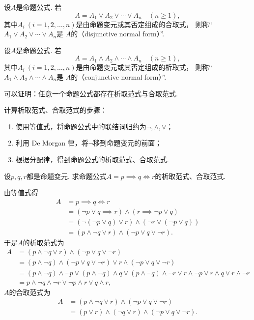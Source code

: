 \begin{definition}
设\(A\)是命题公式.
若\[
	A = A_1 \lor A_2 \lor \dotsb \lor A_n
	\quad(n\geq1),
\]
其中\(A_i\ (i=1,2,\dotsc,n)\)是由命题变元或其否定组成的合取式，
则称“\(A_1 \lor A_2 \lor \dotsb \lor A_n\)是
\(A\)的（disjunctive normal form）”.
\end{definition}

\begin{definition}
设\(A\)是命题公式.
若\[
	A = A_1 \land A_2 \land \dotsb \land A_n
	\quad(n\geq1),
\]
其中\(A_i\ (i=1,2,\dotsc,n)\)是由命题变元或其否定组成的析取式，
则称“\(A_1 \land A_2 \land \dotsb \land A_n\)是
\(A\)的（conjunctive normal form）”.
\end{definition}

可以证明：任意一个命题公式都存在析取范式与合取范式.

计算析取范式、合取范式的步骤：\begin{enumerate}
	\item 使用等值式，将命题公式中的联结词归约为\(\neg,\land,\lor\)；
	\item 利用 De Morgan 律，将\(\neg\)移到命题变元的前面；
	\item 根据分配律，得到命题公式的析取范式、合取范式.
\end{enumerate}

\begin{example}
设\(p,q,r\)都是命题变元.
求命题公式\(A = p \implies q \iff r\)的析取范式、合取范式.
\begin{solution}
由等值式得\begin{align*}
	A &= p \implies q \iff r \\
	&= (\neg p \lor q \implies r) \land (r \implies \neg p \lor q) \\
	&= (\neg(\neg p \lor q) \lor r) \land (\neg r \lor (\neg p \lor q)) \\
	&= (p \land \neg q \lor r) \land (\neg p \lor q \lor \neg r).
\end{align*}
于是\(A\)的析取范式为\begin{align*}
	A &= (p \land \neg q \lor r) \land (\neg p \lor q \lor \neg r) \\
	&= (p \land \neg q) \land (\neg p \lor q \lor \neg r)
		\lor r \land (\neg p \lor q \lor \neg r) \\
	&= (p \land \neg q) \land \neg p
		\lor (p \land \neg q) \land q
		\lor (p \land \neg q) \land \neg r
		\lor r \land \neg p
		\lor r \land q
		\lor r \land \neg r \\
	&= p \land \neg q \land \neg r
		\lor \neg p \land r
		\lor q \land r,
\end{align*}
\(A\)的合取范式为\begin{align*}
	A &= (p \land \neg q \lor r) \land (\neg p \lor q \lor \neg r) \\
	&= (p \lor r) \land (\neg q \lor r) \land (\neg p \lor q \lor \neg r).
\end{align*}
\end{solution}
\end{example}

